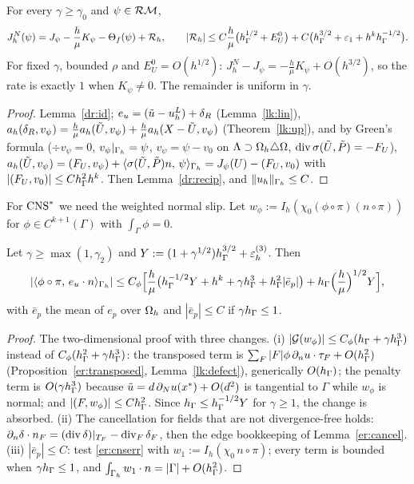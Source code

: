 \begin{theorem}\label{dr:gs}
For every $\gamma\ge\gamma_0$ and $\psi\in\mathcal{RM}$,
\[
J^N_h(\psi)=J_\psi-\frac h\mu K_\psi-\Theta_f(\psi)+\mathcal R_h,\qquad|\mathcal R_h|\le C\frac h\mu\bigl(h_\Gamma^{1/2}+E^0_U\bigr)+C\bigl(h_\Gamma^{3/2}+\varepsilon_1+h^kh_\Gamma^{-1/2}\bigr).
\]
For fixed $\gamma$, bounded $\rho$ and $E^0_U=O(h^{1/2})$: $J^N_h-J_\psi=-\frac h\mu K_\psi+O(h^{3/2})$, so the rate is exactly $1$ when $K_\psi\ne0$. The remainder is uniform in $\gamma$.
\end{theorem}
\begin{proof}
Lemma~\ref{dr:id}; $e_u=(\tilde u-u^L_h)+\delta_R$ (Lemma~\ref{lk:lin}), $a_h(\delta_R,v_\psi)=\frac h\mu a_h(\tilde U,v_\psi)+\frac h\mu a_h(X-\tilde U,v_\psi)$ (Theorem~\ref{lk:up}), and by Green's formula ($\div v_\psi=0$, $v_\psi|_{\Gamma_h}=\psi$, $v_\psi=\psi-v_0$ on $\Lambda\supset\Omega_h\triangle\Omega$, $\operatorname{div}\sigma(\tilde U,\tilde P)=-F_U$), $a_h(\tilde U,v_\psi)=(F_U,v_\psi)+\langle \sigma(\tilde U,\tilde P)n,\, \psi\rangle_{\Gamma_h}=J_\psi(U)-(F_U,v_0)$ with $|(F_U,v_0)|\le Ch_\Gamma^2h^k$. Then Lemma~\ref{dr:recip}, and $\lVert u_h\rVert_{\Gamma_h}\le C$.
\end{proof}

For $\mathrm{CNS}^\ast$ we need the weighted normal slip. Let $w_\phi:=I_h(\chi_0(\phi\circ\pi)(n\circ\pi))$ for $\phi\in C^{k+1}(\Gamma)$ with $\int_\Gamma\phi=0$.
\begin{lemma}\label{dr:slip}
Let $\gamma\ge\max(1,\gamma_2)$ and $Y:=(1+\gamma^{1/2})h_\Gamma^{3/2}+\varepsilon_h^{(3)}$. Then
\[
|\langle \phi\circ\pi,\, e_u\cdot n\rangle_{\Gamma_h}|\le C_\phi\Bigl[\frac h\mu\bigl(h_\Gamma^{-1/2}Y+h^k+\gamma h_\Gamma^3+h_\Gamma^2|\bar e_p|\bigr)+h_\Gamma\Bigl(\frac h\mu\Bigr)^{1/2}Y\Bigr],
\]
with $\bar e_p$ the mean of $e_p$ over $\Omega_h$ and $|\bar e_p|\le C$ if $\gamma h_\Gamma\le1$.
\end{lemma}
\begin{proof}
The two-dimensional proof \cite{PadhiLong2D} with three changes. (i) $|\mathcal G(w_\phi)|\le C_\phi(h_\Gamma+\gamma h_\Gamma^3)$ instead of $C_\phi(h_\Gamma^2+\gamma h_\Gamma^3)$: the transposed term is $\sum_F|F|\phi\,\partial_n u\cdot\tau_F+O(h_\Gamma^2)$ (Proposition~\ref{er:transposed}, Lemma~\ref{lk:defect}), generically $O(h_\Gamma)$; the penalty term is $O(\gamma h_\Gamma^3)$ because $\tilde u=d\,\partial_Nu(x^\ast)+O(d^2)$ is tangential to $\Gamma$ while $w_\phi$ is normal; and $|(F,w_\phi)|\le Ch_\Gamma^2$. Since $h_\Gamma\le h_\Gamma^{-1/2}Y$ for $\gamma\ge1$, the change is absorbed. (ii) The cancellation for fields that are not divergence-free holds: $\partial_n\delta\cdot n_F=(\operatorname{div}\delta)|_{T_F}-\operatorname{div}_F\delta_F$, then the edge bookkeeping of Lemma~\ref{er:cancel}. (iii) $|\bar e_p|\le C$: test \eqref{er:cnserr} with $w_1:=I_h(\chi_0\,n\circ\pi)$; every term is bounded when $\gamma h_\Gamma\le1$, and $\int_{\Gamma_h}w_1\cdot n=|\Gamma|+O(h_\Gamma^2)$.
\end{proof}

